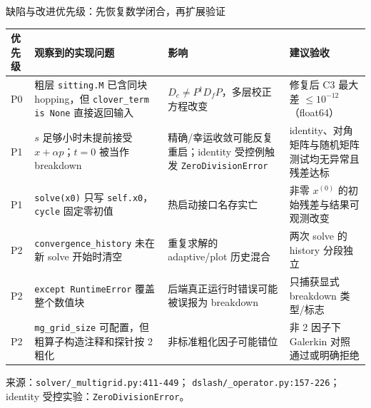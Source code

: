 \documentclass[UTF8,aspectratio=169,11pt]{ctexbeamer}
\newcommand{\source}[1]{%
  \vspace{0.06em}\par{\raggedright\scriptsize\color{muted}来源：#1\par}}
\newcommand{\pathref}[1]{\nolinkurl{#1}}
\begin{document}
\begin{frame}[t]{缺陷与改进优先级：先恢复数学闭合，再扩展验证}
  \begin{center}
    \scriptsize
    \begin{tabular}{@{}P{0.06\textwidth}P{0.29\textwidth}P{0.34\textwidth}P{0.21\textwidth}@{}}
      \toprule
      优先级 & 观察到的实现问题 & 影响 & 建议验收 \\
      \midrule
      P0 & 粗层 \texttt{sitting.M} 已含同块 hopping，但
      \texttt{clover\_term is None} 直接返回输入 & $D_c\ne P^\dagger D_fP$，多层校正方程改变 & 修复后 C3 最大差
      $\le10^{-12}$（float64） \\
      P1 & $s$ 足够小时未提前接受 $x+\alpha p$；$t=0$ 被当作 breakdown & 精确/幸运收敛可能反复重启；identity 受控例触发
      \texttt{ZeroDivisionError} & identity、对角矩阵与随机矩阵测试均无异常且残差达标 \\
      P1 & \texttt{solve(x0)} 只写 \texttt{self.x0}，\texttt{cycle} 固定零初值 & 热启动接口名存实亡 & 非零 $x^{(0)}$ 的初始残差与结果可观测改变 \\
      P2 & \texttt{convergence\_history} 未在新 solve 开始时清空 & 重复求解的 adaptive/plot 历史混合 & 两次 solve 的 history 分段独立 \\
      P2 & \texttt{except RuntimeError} 覆盖整个数值块 & 后端真正运行时错误可能被误报为 breakdown & 只捕获显式 breakdown 类型/标志 \\
      P2 & \texttt{mg\_grid\_size} 可配置，但粗算子构造注释和探针按 2 粗化 & 非标准粗化因子可能错位 & 非 2 因子下 Galerkin 对照通过或明确拒绝 \\
      \bottomrule
    \end{tabular}
  \end{center}
  \source{\pathref{solver/_multigrid.py:411-449}；
  \pathref{dslash/_operator.py:157-226}；
  identity 受控实验：\texttt{ZeroDivisionError}。}
\end{frame}
\end{document}
